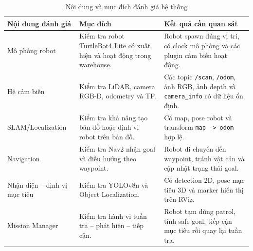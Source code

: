 \begin{table}[H]
    \centering
    \caption{Nội dung và mục đích đánh giá hệ thống}
    \label{tab:evaluation-scope}
    \renewcommand{\arraystretch}{1.25}
    \small
    \begin{tabularx}{\textwidth}{|>{\raggedright\arraybackslash}p{}|>{\raggedright\arraybackslash}p{}|>{\raggedright\arraybackslash}X|}
        \hline
        \textbf{Nội dung đánh giá} & \textbf{Mục đích} & \textbf{Kết quả cần quan sát} \\
        \hline
        Mô phỏng robot & Kiểm tra robot TurtleBot4 Lite có xuất hiện và hoạt động trong warehouse. & Robot spawn đúng vị trí, có clock mô phỏng và các plugin cảm biến hoạt động. \\
        \hline
        Hệ cảm biến & Kiểm tra LiDAR, camera RGB-D, odometry và TF. & Các topic \texttt{/scan}, \texttt{/odom}, ảnh RGB, ảnh depth và \texttt{camera\_info} có dữ liệu ổn định. \\
        \hline
        SLAM/Localization & Kiểm tra khả năng tạo bản đồ hoặc định vị robot trên bản đồ. & Có map, pose robot và transform \texttt{map -> odom} hợp lệ. \\
        \hline
        Navigation & Kiểm tra Nav2 nhận goal và điều hướng theo waypoint. & Robot di chuyển đến waypoint, tránh vật cản và cập nhật trạng thái goal. \\
        \hline
        Nhận diện -- định vị mục tiêu & Kiểm tra YOLOv8n và Object Localization. & Có detection 2D, pose mục tiêu 3D và marker hiển thị trên RViz. \\
        \hline
        Mission Manager & Kiểm tra hành vi tuần tra -- phát hiện -- tiếp cận. & Robot tạm dừng patrol, tính safe goal, tiếp cận mục tiêu rồi quay lại tuần tra. \\
        \hline
    \end{tabularx}
\end{table}

